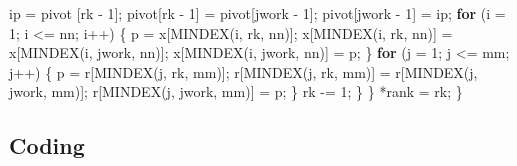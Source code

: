 \documentclass[
  12pt,
]{book}
\newenvironment{Shaded}{\begin{snugshade}}{\end{snugshade}}
\newcommand{\ControlFlowTok}[1]{\textcolor[rgb]{0.13,0.29,0.53}{\textbf{#1}}}
\newcommand{\DecValTok}[1]{\textcolor[rgb]{0.00,0.00,0.81}{#1}}
\newcommand{\NormalTok}[1]{#1}
\begin{document}
\begin{Shaded}
\begin{Highlighting}[]
\NormalTok{      ip = pivot [rk {-} }\DecValTok{1}\NormalTok{];}
\NormalTok{      pivot[rk {-} }\DecValTok{1}\NormalTok{] = pivot[jwork {-} }\DecValTok{1}\NormalTok{];}
\NormalTok{      pivot[jwork {-} }\DecValTok{1}\NormalTok{] = ip;}
      \ControlFlowTok{for}\NormalTok{ (i = }\DecValTok{1}\NormalTok{; i \textless{}= nn; i++) \{}
\NormalTok{        p = x[MINDEX(i, rk, nn)];}
\NormalTok{        x[MINDEX(i, rk, nn)] = x[MINDEX(i, jwork, nn)];}
\NormalTok{        x[MINDEX(i, jwork, nn)] = p;}
\NormalTok{      \}}
      \ControlFlowTok{for}\NormalTok{ (j = }\DecValTok{1}\NormalTok{; j \textless{}= mm; j++) \{}
\NormalTok{        p = r[MINDEX(j, rk, mm)];}
\NormalTok{        r[MINDEX(j, rk, mm)] = r[MINDEX(j, jwork, mm)];}
\NormalTok{        r[MINDEX(j, jwork, mm)] = p;}
\NormalTok{      \}}
\NormalTok{      rk {-}= }\DecValTok{1}\NormalTok{;}
\NormalTok{    \}}
\NormalTok{  \}}
\NormalTok{  *rank = rk;}
\NormalTok{\}}
\end{Highlighting}
\end{Shaded}

\hypertarget{coding-1}{%
\subsection{Coding}\label{coding-1}}
\end{document}
